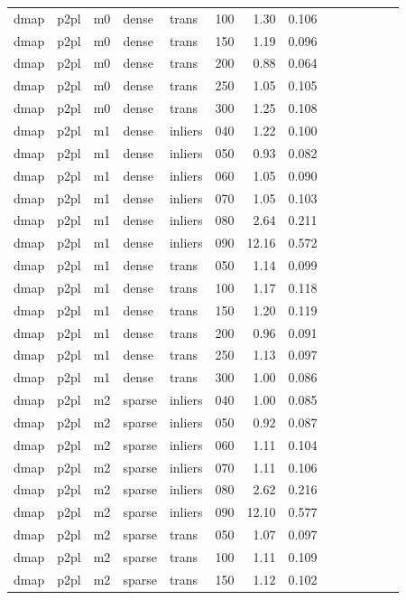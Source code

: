 \begin{table}[htbp]
\begin{tabular}{llllllrrrrrrrr}
  dmap & p2pl & m0 & dense & trans & 100 & 1.30 & 0.106 \\
  dmap & p2pl & m0 & dense & trans & 150 & 1.19 & 0.096 \\
  dmap & p2pl & m0 & dense & trans & 200 & 0.88 & 0.064 \\
  dmap & p2pl & m0 & dense & trans & 250 & 1.05 & 0.105 \\
  dmap & p2pl & m0 & dense & trans & 300 & 1.25 & 0.108 \\
  dmap & p2pl & m1 & dense & inliers & 040 & 1.22 & 0.100 \\
  dmap & p2pl & m1 & dense & inliers & 050 & 0.93 & 0.082 \\
  dmap & p2pl & m1 & dense & inliers & 060 & 1.05 & 0.090 \\
  dmap & p2pl & m1 & dense & inliers & 070 & 1.05 & 0.103 \\
  dmap & p2pl & m1 & dense & inliers & 080 & 2.64 & 0.211 \\
  dmap & p2pl & m1 & dense & inliers & 090 & 12.16 & 0.572 \\
  dmap & p2pl & m1 & dense & trans & 050 & 1.14 & 0.099 \\
  dmap & p2pl & m1 & dense & trans & 100 & 1.17 & 0.118 \\
  dmap & p2pl & m1 & dense & trans & 150 & 1.20 & 0.119 \\
  dmap & p2pl & m1 & dense & trans & 200 & 0.96 & 0.091 \\
  dmap & p2pl & m1 & dense & trans & 250 & 1.13 & 0.097 \\
  dmap & p2pl & m1 & dense & trans & 300 & 1.00 & 0.086 \\
  dmap & p2pl & m2 & sparse & inliers & 040 & 1.00 & 0.085 \\
  dmap & p2pl & m2 & sparse & inliers & 050 & 0.92 & 0.087 \\
  dmap & p2pl & m2 & sparse & inliers & 060 & 1.11 & 0.104 \\
  dmap & p2pl & m2 & sparse & inliers & 070 & 1.11 & 0.106 \\
  dmap & p2pl & m2 & sparse & inliers & 080 & 2.62 & 0.216 \\
  dmap & p2pl & m2 & sparse & inliers & 090 & 12.10 & 0.577 \\
  dmap & p2pl & m2 & sparse & trans & 050 & 1.07 & 0.097 \\
  dmap & p2pl & m2 & sparse & trans & 100 & 1.11 & 0.109 \\
  dmap & p2pl & m2 & sparse & trans & 150 & 1.12 & 0.102 \\

\end{tabular}
\end{table}
